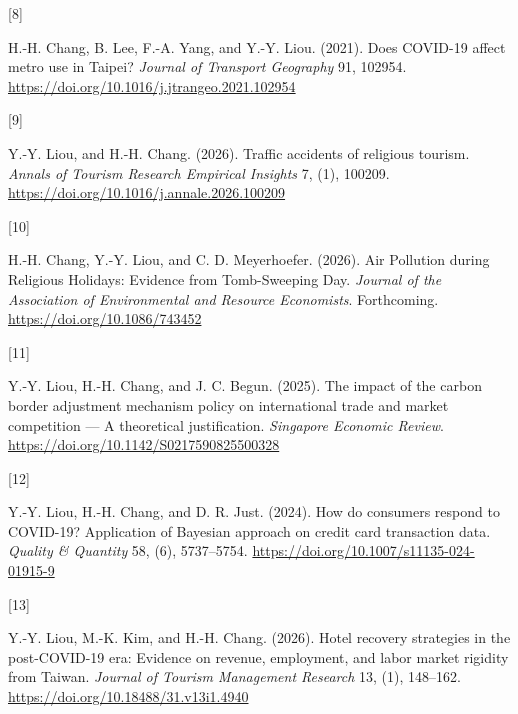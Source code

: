 \documentclass[
  11pt,
]{article}
\newlength{\cslhangindent}
\newlength{\csllabelwidth}
\newenvironment{CSLReferences}[2] %
 {\begin{list}{}{%
  \setlength{\itemindent}{0pt}
  \setlength{\leftmargin}{0pt}
  \setlength{\parsep}{0pt}
  \ifodd #1
   \setlength{\leftmargin}{\cslhangindent}
   \setlength{\itemindent}{-1\cslhangindent}
  \fi
  \setlength{\itemsep}{#2\baselineskip}}}
 {\end{list}}
\newcommand{\CSLLeftMargin}[1]{\parbox[t]{\csllabelwidth}{\strut#1\strut}}
\newcommand{\CSLRightInline}[1]{\parbox[t]{\linewidth - \csllabelwidth}{\strut#1\strut}}
\begin{document}
\begin{CSLReferences}{0}{0}
\CSLLeftMargin{{[}8{]} }%
\CSLRightInline{H.-H. Chang, B. Lee, F.-A. Yang, and Y.-Y. Liou. (2021).
Does COVID-19 affect metro use in {T}aipei? \emph{Journal of Transport
Geography} 91, 102954.
\url{https://doi.org/10.1016/j.jtrangeo.2021.102954}}

\CSLLeftMargin{{[}9{]} }%
\CSLRightInline{Y.-Y. Liou, and H.-H. Chang. (2026). Traffic accidents
of religious tourism. \emph{Annals of Tourism Research Empirical
Insights} 7, (1), 100209.
\url{https://doi.org/10.1016/j.annale.2026.100209}}

\CSLLeftMargin{{[}10{]} }%
\CSLRightInline{H.-H. Chang, Y.-Y. Liou, and C. D. Meyerhoefer. (2026).
{Air Pollution during Religious Holidays: Evidence from Tomb-Sweeping
Day}. \emph{Journal of the Association of Environmental and Resource
Economists}. Forthcoming. \url{https://doi.org/10.1086/743452}}

\CSLLeftMargin{{[}11{]} }%
\CSLRightInline{Y.-Y. Liou, H.-H. Chang, and J. C. Begun. (2025). The
impact of the carbon border adjustment mechanism policy on international
trade and market competition --- {A} theoretical justification.
\emph{Singapore Economic Review}.
\url{https://doi.org/10.1142/S0217590825500328}}

\CSLLeftMargin{{[}12{]} }%
\CSLRightInline{Y.-Y. Liou, H.-H. Chang, and D. R. Just. (2024). How do
consumers respond to COVID-19? Application of {B}ayesian approach on
credit card transaction data. \emph{Quality \& Quantity} 58, (6),
5737--5754. \url{https://doi.org/10.1007/s11135-024-01915-9}}

\CSLLeftMargin{{[}13{]} }%
\CSLRightInline{Y.-Y. Liou, M.-K. Kim, and H.-H. Chang. (2026). Hotel
recovery strategies in the post-COVID-19 era: Evidence on revenue,
employment, and labor market rigidity from {T}aiwan. \emph{Journal of
Tourism Management Research} 13, (1), 148--162.
\url{https://doi.org/10.18488/31.v13i1.4940}}

\end{CSLReferences}
\end{document}
